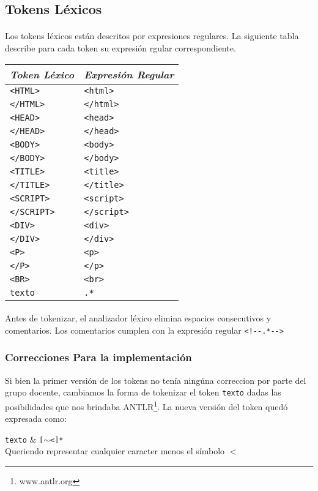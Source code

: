 \subsection{Tokens L\'exicos}

\paragraph{} Los tokens l\'exicos est\'an descritos por expresiones regulares. La siguiente tabla describe para cada token su expresi\'on rgular correspondiente.


\begin{center}
    
\begin{tabular}{|l|l|}
\hline
\emph{Token L\'exico} & \emph{Expresi\'on Regular}\\
\hline \hline
\verb|<HTML>| & \texttt{<html>} \\
\verb|</HTML>| & \texttt{</html>}\\
\verb|<HEAD>| & \texttt{<head>}\\
\verb|</HEAD>| & \texttt{</head>}\\
\verb|<BODY>| & \texttt{<body>}\\
\verb|</BODY>| & \texttt{</body>}\\
\verb|<TITLE>| & \texttt{<title>}\\
\verb|</TITLE>| & \texttt{</title>}\\
\verb|<SCRIPT>| & \texttt{<script>}\\
\verb|</SCRIPT>| & \texttt{</script>}\\
\verb|<DIV>| & \texttt{<div>}\\
\verb|</DIV>| & \texttt{</div>}\\
\verb|<P>| & \texttt{<p>}\\
\verb|</P>| & \texttt{</p>}\\
\verb|<BR>| & \texttt{<br>}\\
\verb|texto| & \texttt{.*}\\
\hline
\end{tabular}

\end{center}
\paragraph{} Antes de tokenizar, el analizador l\'exico elimina espacios consecutivos y comentarios.
Los comentarios cumplen con la expresi\'on regular \verb|<!--.*-->|

\subsubsection{Correcciones Para la implementaci\'on}
Si bien la primer versi\'on de los tokens no ten\'ia ning\'una correccion por parte del grupo docente, cambiamos la forma de tokenizar el token \verb|texto| dadas las posibilidades que nos brindaba ANTLR\footnote{www.antlr.org}. La nueva versi\'on del token qued\'o expresada como:

\verb|texto| & \texttt{[$\sim$<]*}\\
Queriendo representar cualquier caracter menos el s\'imbolo $<$

